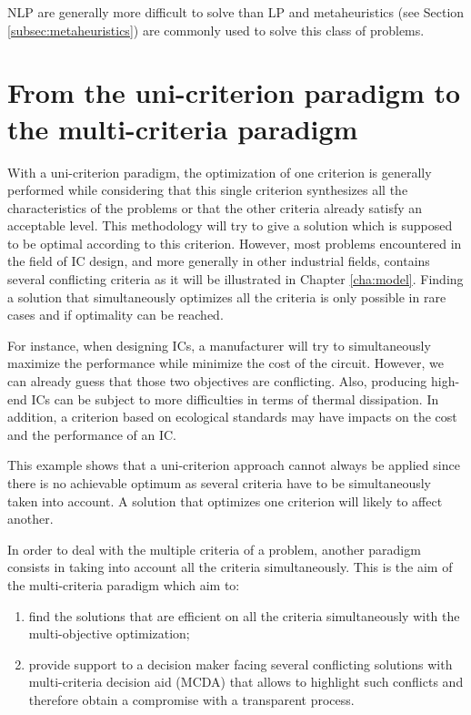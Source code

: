 NLP are generally more difficult to solve than LP \cite{talbi09} and metaheuristics (see Section \ref{subsec:metaheuristics}) are commonly used to solve this class of problems.




\section{From the uni-criterion paradigm to the multi-criteria paradigm}
\label{sec:rol2.unicritmulticrit}

With a uni-criterion paradigm, the optimization of one criterion is generally performed while considering that this single criterion synthesizes all the characteristics of the problems or that the other criteria already satisfy an acceptable level. This methodology will try to give a solution which is supposed to be optimal according to this criterion. However, most problems encountered in the field of IC design, and more generally in other industrial fields, contains several conflicting criteria as it will be illustrated in Chapter \ref{cha:model}. Finding a solution that simultaneously optimizes all the criteria is only possible in rare cases and if optimality can be reached.

For instance, when designing ICs, a manufacturer will try to simultaneously maximize the performance while minimize the cost of the circuit. However, we can already guess that those two objectives are conflicting. Also, producing high-end ICs can be subject to more difficulties in terms of thermal dissipation. In addition, a criterion based on ecological standards may have impacts on the cost and the performance of an IC.

This example shows that a uni-criterion approach cannot always be applied since there is no achievable optimum as several criteria have to be simultaneously taken into account. A solution that optimizes one criterion will likely to affect another.

In order to deal with the multiple criteria of a problem, another paradigm consists in taking into account all the criteria simultaneously. This is the aim of the multi-criteria paradigm which aim to:
\begin{enumerate}
\item find the solutions that are efficient on all the criteria simultaneously with the multi-objective optimization;
\item provide support to a decision maker facing several conflicting solutions with multi-criteria decision aid (MCDA) that allows to highlight such conflicts and therefore obtain a compromise with a transparent process.
\end{enumerate}

